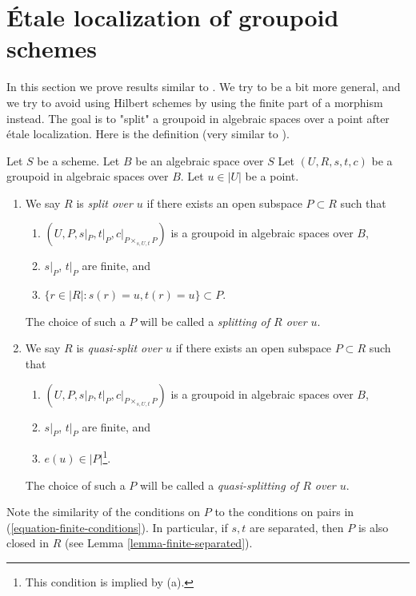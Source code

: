 \section{\'Etale localization of groupoid schemes}
\label{section-etale-localize}

\noindent
In this section we prove results similar to \cite[Proposition 4.2]{K-M}.
We try to be a bit more general, and we try to avoid using Hilbert schemes
by using the finite part of a morphism instead.
The goal is to "split" a groupoid in algebraic spaces over a point
after \'etale localization. Here is the definition (very similar to
\cite[Definition 4.1]{K-M}).

\begin{definition}
\label{definition-split-at-point}
Let $S$ be a scheme. Let $B$ be an algebraic space over $S$
Let $(U, R, s, t, c)$ be a groupoid in algebraic spaces over $B$.
Let $u \in |U|$ be a point.
\begin{enumerate}
\item We say $R$ is {\it split over $u$} if there exists an open
subspace $P \subset R$ such that
\begin{enumerate}
\item $(U, P, s|_P, t|_P, c|_{P \times_{s, U, t} P})$ is a
groupoid in algebraic spaces over $B$,
\item $s|_P$, $t|_P$ are finite, and
\item $\{r \in |R| : s(r) = u, t(r) = u\} \subset P$.
\end{enumerate}
The choice of such a $P$ will be called a {\it splitting of $R$ over $u$}.
\item We say $R$ is {\it quasi-split over $u$} if there exists an open
subspace $P \subset R$ such that
\begin{enumerate}
\item $(U, P, s|_P, t|_P, c|_{P \times_{s, U, t} P})$ is a
groupoid in algebraic spaces over $B$,
\item $s|_P$, $t|_P$ are finite, and
\item $e(u) \in |P|$\footnote{This condition is implied by (a).}.
\end{enumerate}
The choice of such a $P$ will be called a {\it quasi-splitting of $R$ over $u$}.
\end{enumerate}
\end{definition}

\noindent
Note the similarity of the conditions on $P$ to the conditions on
pairs in (\ref{equation-finite-conditions}). In particular, if
$s, t$ are separated, then $P$ is also closed in $R$ (see
Lemma \ref{lemma-finite-separated}).

